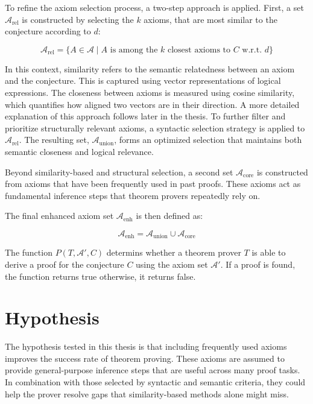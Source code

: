 \documentclass[english,version-2020-11]{uzl-thesis}
\begin{document}
To refine the axiom selection process, a two-step approach is applied. First, a set \( \mathcal{A}_{\text{rel}} \) is constructed by selecting the \( k \)  axioms, that are most similar to the conjecture according to \( d \):

\begin{equation}
    \mathcal{A}_{\text{rel}} = \{ A \in \mathcal{A} \mid A \text{ is among the } k \text{ closest axioms to } C \text{ w.r.t. } d \}
\end{equation}

In this context, similarity refers to the semantic relatedness between an axiom and the conjecture. This is captured using vector representations of logical expressions. The closeness between axioms is measured using cosine similarity, which quantifies how aligned two vectors are in their direction. A more detailed explanation of this approach follows later in the thesis.
To further filter and prioritize structurally relevant axioms, a syntactic selection strategy is applied to \( \mathcal{A}_{\text{rel}} \). The resulting set, \( \mathcal{A}_{\text{union}} \), forms an optimized selection that maintains both semantic closeness and logical relevance.

Beyond similarity-based and structural selection, a second set \( \mathcal{A}_{\text{core}} \) is constructed from axioms that have been frequently used in past proofs. These axioms act as fundamental inference steps that theorem provers repeatedly rely on.

The final enhanced axiom set \( \mathcal{A}_{\text{enh}} \) is then defined as:

\begin{equation}
    \mathcal{A}_{\text{enh}} = \mathcal{A}_{\text{union}} \cup \mathcal{A}_{\text{core}}
\end{equation}

The function \( P(T, \mathcal{A}', C) \) determins whether a theorem prover \( T \) is able to derive a proof for the conjecture \( C \) using the axiom set \( \mathcal{A}' \). If a proof is found, the function returns true otherwise, it returns false.

\section{Hypothesis}

The hypothesis tested in this thesis is that including frequently used axioms improves the success rate of theorem proving. These axioms are assumed to provide general-purpose inference steps that are useful across many proof tasks. In combination with those selected by syntactic and semantic criteria, they could help the prover resolve gaps that similarity-based methods alone might miss.
\end{document}
